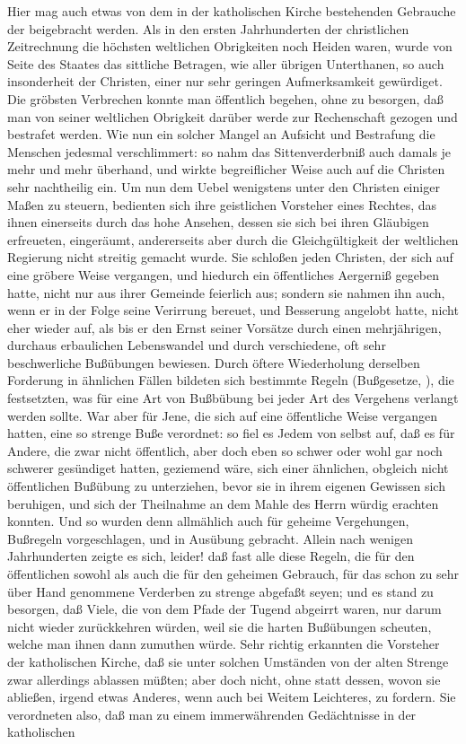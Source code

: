 \begin{RWanm} 
Hier mag auch etwas von dem in der katholischen Kirche bestehenden Gebrauche der  beigebracht werden. Als in den ersten Jahrhunderten der christlichen Zeitrechnung die höchsten weltlichen Obrigkeiten noch Heiden waren, wurde von Seite des Staates das sittliche Betragen, wie aller übrigen Unterthanen, so auch insonderheit der Christen, einer nur sehr geringen Aufmerksamkeit gewürdiget. Die gröbsten Verbrechen konnte man öffentlich begehen, ohne zu besorgen, daß man von seiner weltlichen Obrigkeit darüber werde zur Rechenschaft gezogen und bestrafet werden. Wie nun ein solcher Mangel an Aufsicht und Bestrafung die Menschen jedesmal verschlimmert: so nahm das Sittenverderbniß auch damals je mehr und mehr überhand, und wirkte begreiflicher Weise auch auf die Christen sehr nachtheilig ein. Um nun dem Uebel wenigstens unter den Christen einiger Maßen zu steuern, bedienten sich ihre geistlichen Vorsteher eines Rechtes, das ihnen einerseits durch das hohe Ansehen, dessen sie sich bei ihren Gläubigen erfreueten, eingeräumt, andererseits aber durch die Gleichgültigkeit der weltlichen Regierung nicht streitig gemacht wurde. Sie schloßen jeden Christen, der sich auf eine gröbere Weise vergangen, und hiedurch ein öffentliches Aergerniß gegeben hatte, nicht nur aus ihrer Gemeinde feierlich aus; sondern sie nahmen ihn auch, wenn er in der Folge seine Verirrung bereuet, und Besserung angelobt hatte, nicht eher wieder auf, als bis er den Ernst seiner Vorsätze durch einen mehrjährigen, durchaus erbaulichen Lebenswandel und durch verschiedene, oft sehr beschwerliche Bußübungen bewiesen. Durch öftere Wiederholung derselben Forderung in ähnlichen Fällen bildeten sich bestimmte Regeln (Bußgesetze, ), die festsetzten, was für eine Art von Bußbübung bei jeder Art des Vergehens verlangt werden sollte. War aber für Jene, die sich auf eine öffentliche Weise vergangen hatten, eine so strenge Buße verordnet: so fiel es Jedem von selbst auf, daß es für Andere, die zwar nicht öffentlich, aber doch eben so schwer oder wohl gar noch schwerer gesündiget hatten, geziemend wäre, sich einer ähnlichen, obgleich nicht öffentlichen Bußübung zu unterziehen, bevor sie in ihrem eigenen Gewissen sich beruhigen, und sich der Theilnahme an dem Mahle des Herrn würdig erachten konnten. Und so wurden denn allmählich auch für geheime Vergehungen, Bußregeln vorgeschlagen, und in Ausübung gebracht. Allein nach wenigen Jahrhunderten zeigte es sich, leider! daß fast alle diese Regeln, die für den öffentlichen sowohl als auch die für den geheimen Gebrauch, für das schon zu sehr über Hand genommene Verderben zu strenge abgefaßt seyen; und es stand zu besorgen, daß Viele, die von dem Pfade der Tugend abgeirrt waren, nur darum nicht wieder zurückkehren würden, weil sie die harten Bußübungen scheuten, welche man ihnen dann zumuthen würde. Sehr richtig erkannten die Vorsteher der katholischen Kirche, daß sie unter solchen Umständen von der alten Strenge zwar allerdings ablassen müßten; aber doch nicht, ohne statt dessen, wovon sie abließen, irgend etwas Anderes, wenn auch bei Weitem Leichteres, zu fordern. Sie verordneten also, daß man zu einem immerwährenden Gedächtnisse in der katholischen 
\end{RWanm}
